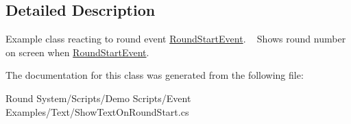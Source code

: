\subsection{Detailed Description}
Example class reacting to round event \hyperlink{class_round_manager_1_1_events_1_1_round_start_event}{Round\+Start\+Event}. ~\newline
Shows round number on screen when \hyperlink{class_round_manager_1_1_events_1_1_round_start_event}{Round\+Start\+Event}. 



The documentation for this class was generated from the following file\+:\begin{DoxyCompactItemize}
\item 
Round System/\+Scripts/\+Demo Scripts/\+Event Examples/\+Text/Show\+Text\+On\+Round\+Start.\+cs\end{DoxyCompactItemize}
